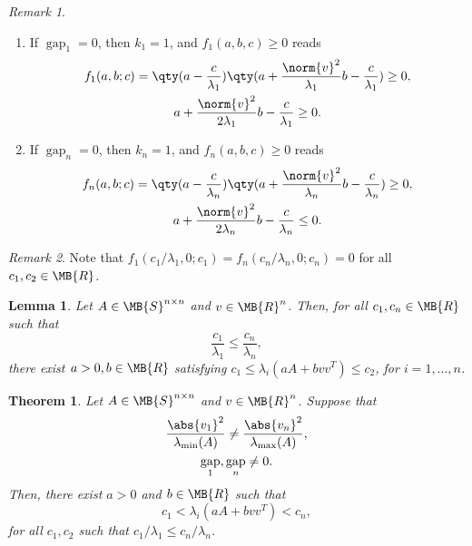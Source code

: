 \documentclass[nobib]{my-handout}
\newtheorem{theorem}{Theorem}
\newtheorem{lemma}{Lemma}
\theoremstyle{definition}
\theoremstyle{remark}
\newtheorem{remark}{Remark}
\DeclareMathOperator{\gap}{gap}
\begin{document}
\begin{remark}
	\begin{enumerate}
		\item If $\gap_1 = 0$, then $k_1 = 1$, and $f_1(a, b, c) \ge 0$ reads
			\begin{gather*}
				f_1(a, b; c) = \qty(a - \frac{c}{\lambda_1}) \qty(a +
				\frac{\norm{v}^2}{\lambda_1} b - \frac{c}{\lambda_1}) \ge 0, \\
				a + \frac{\norm{v}^2}{2 \lambda_1} b - \frac{c}{\lambda_1} \ge 0.
			\end{gather*}
		\item If $\gap_n = 0$, then $k_n = 1$, and $f_n(a, b, c) \ge 0$ reads
			\begin{gather*}
				f_n(a, b; c) = \qty(a - \frac{c}{\lambda_n}) \qty(a +
				\frac{\norm{v}^2}{\lambda_n} b - \frac{c}{\lambda_n}) \ge 0, \\
				a + \frac{\norm{v}^2}{2 \lambda_n} b - \frac{c}{\lambda_n} \le 0.
			\end{gather*}
	\end{enumerate}
\end{remark}

\begin{remark}
	Note that $f_1(c_1/\lambda_1, 0; c_1) = f_n(c_n/\lambda_n, 0; c_n) = 0$ for
	all $c_1, c_2 \in \MB{R}$.
\end{remark}

\begin{lemma}
	Let $A \in \MB{S}^{n \times n}$ and $v \in \MB{R}^n$. Then, for all $c_1, c_n
	\in \MB{R}$ such that
	\begin{equation*}
		\frac{c_1}{\lambda_1} \le \frac{c_n}{\lambda_n},
	\end{equation*}
	there exist $a>0, b \in \MB{R}$ satisfying $c_1 \le \lambda_i(a A + b v v^T)
	\le c_2$, for $i = 1, \dotsc, n$.
\end{lemma}

\begin{theorem}
	Let $A \in \MB{S}^{n \times n}$ and $v \in \MB{R}^n$. Suppose that 
	\begin{gather}
		\frac{\abs{v_1}^2}{\lambda_{\min}(A)} \ne
		\frac{\abs{v_n}^2}{\lambda_{\max}(A)}, \\
		\gap_1, \gap_n \ne 0.
	\end{gather}
	Then, there exist $a > 0$ and $b \in \MB{R}$ such that
	\begin{equation*}
		c_1 < \lambda_i(a A + b v v^T) < c_n,
	\end{equation*}
	for all $c_1, c_2$ such that $c_1/\lambda_1 \le c_n/\lambda_n$.
\end{theorem}
\end{document}
